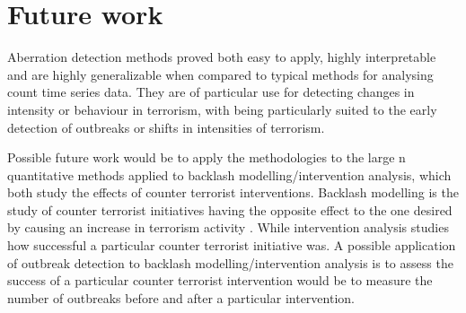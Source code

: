 \section{Future work}

Aberration detection methods proved both easy to apply, highly interpretable and are highly generalizable when compared to typical methods for analysing count time series data. They are of particular use for detecting changes in intensity or behaviour in terrorism, with being particularly suited to the early detection of outbreaks or shifts in intensities of terrorism. 

Possible future work would be to apply the methodologies to the large n quantitative methods applied to backlash modelling/intervention analysis, which both study the effects of counter terrorist interventions. Backlash modelling is the study of counter terrorist initiatives having the opposite effect to the one desired by causing an increase in terrorism activity \citep{argomaniz2015examining}. While intervention analysis studies how successful a particular counter terrorist initiative was. A possible application of outbreak detection to backlash modelling/intervention analysis is to assess the success of a particular counter terrorist intervention would be to measure the number of outbreaks before and after a particular intervention. 
